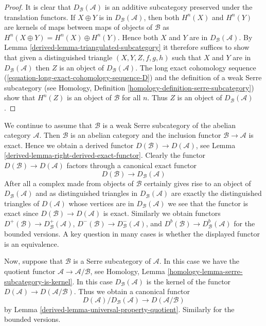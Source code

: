 \begin{proof}

It is clear that $D_\mathcal{B}(\mathcal{A})$ is an additive subcategory
preserved under the translation functors.
If $X \oplus Y$ is in $D_\mathcal{B}(\mathcal{A})$, then
both $H^n(X)$ and $H^n(Y)$ are kernels of maps between maps of objects
of $\mathcal{B}$ as $H^n(X \oplus Y) = H^n(X) \oplus H^n(Y)$.
Hence both $X$ and $Y$ are in $D_\mathcal{B}(\mathcal{A})$. By
Lemma \ref{derived-lemma-triangulated-subcategory}
it therefore suffices to show that given a distinguished triangle
$(X, Y, Z, f, g, h)$ such that $X$ and $Y$ are in $D_\mathcal{B}(\mathcal{A})$
then $Z$ is an object of $D_\mathcal{B}(\mathcal{A})$. The long exact
cohomology sequence (\ref{equation-long-exact-cohomology-sequence-D})
and the definition of a weak Serre subcategory (see
Homology, Definition \ref{homology-definition-serre-subcategory})
show that $H^n(Z)$ is an object of $\mathcal{B}$ for all $n$.
Thus $Z$ is an object of $D_\mathcal{B}(\mathcal{A})$.
\end{proof}

We continue to assume that $\mathcal{B}$ is a weak Serre subcategory
of the abelian category $\mathcal{A}$. Then $\mathcal{B}$ is an abelian
category and the inclusion functor $\mathcal{B} \to \mathcal{A}$ is exact.
Hence we obtain a derived functor $D(\mathcal{B}) \to D(\mathcal{A})$, see
Lemma \ref{derived-lemma-right-derived-exact-functor}. Clearly the
functor $D(\mathcal{B}) \to D(\mathcal{A})$ factors through a canonical
exact functor
\begin{equation}
\label{equation-compare}
D(\mathcal{B}) \longrightarrow D_\mathcal{B}(\mathcal{A})
\end{equation}
After all a complex made from objects of $\mathcal{B}$ certainly
gives rise to an object of $D_\mathcal{B}(\mathcal{A})$ and as
distinguished triangles in $D_\mathcal{B}(\mathcal{A})$ are exactly the
distinguished triangles of $D(\mathcal{A})$ whose vertices are in
$D_\mathcal{B}(\mathcal{A})$ we see that the functor is exact since
$D(\mathcal{B}) \to D(\mathcal{A})$ is exact. Similarly we obtain functors
$D^+(\mathcal{B}) \to D^+_\mathcal{B}(\mathcal{A})$,
$D^-(\mathcal{B}) \to D^-_\mathcal{B}(\mathcal{A})$, and
$D^b(\mathcal{B}) \to D^b_\mathcal{B}(\mathcal{A})$
for the bounded versions. A key question in many cases is whether the
displayed functor is an equivalence.

\medskip\noindent
Now, suppose that $\mathcal{B}$ is a Serre subcategory of $\mathcal{A}$.
In this case we have the quotient functor
$\mathcal{A} \to \mathcal{A}/\mathcal{B}$, see
Homology, Lemma \ref{homology-lemma-serre-subcategory-is-kernel}.
In this case $D_\mathcal{B}(\mathcal{A})$ is the kernel of the functor
$D(\mathcal{A}) \to D(\mathcal{A}/\mathcal{B})$.
Thus we obtain a canonical functor
$$
D(\mathcal{A})/D_\mathcal{B}(\mathcal{A})
\longrightarrow
D(\mathcal{A}/\mathcal{B})
$$
by
Lemma \ref{derived-lemma-universal-property-quotient}.
Similarly for the bounded versions.


